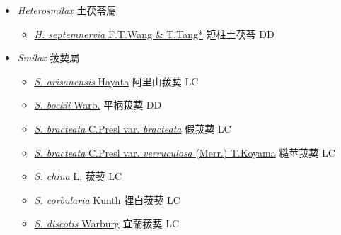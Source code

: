 
  \begin{itemize}
 \item[] \textit{Heterosmilax} 土茯苓屬
                                
  \begin{itemize}
        \item[] \href{http://www.theplantlist.org/tpl1.1/search?q=Heterosmilax+septemnervia}{\textit{H. septemnervia} F.T.Wang \& T.Tang*}   短柱土茯苓   DD
  \end{itemize}
 \item[] \textit{Smilax} 菝葜屬
                                
  \begin{itemize}
        \item[] \href{http://www.theplantlist.org/tpl1.1/search?q=Smilax+arisanensis}{\textit{S. arisanensis} Hayata}   阿里山菝葜   LC
        \item[] \href{http://www.theplantlist.org/tpl1.1/search?q=Smilax+bockii}{\textit{S. bockii} Warb.}   平柄菝葜   DD
        \item[] \href{http://www.theplantlist.org/tpl1.1/search?q=Smilax+bracteata+var.+bracteata}{\textit{S. bracteata} C.Presl var. \textit{bracteata}}   假菝葜   LC
        \item[] \href{http://www.theplantlist.org/tpl1.1/search?q=Smilax+bracteata+var.+verruculosa}{\textit{S. bracteata} C.Presl var. \textit{verruculosa} (Merr.) T.Koyama}   糙莖菝葜   LC
        \item[] \href{http://www.theplantlist.org/tpl1.1/search?q=Smilax+china}{\textit{S. china} L.}   菝葜   LC
        \item[] \href{http://www.theplantlist.org/tpl1.1/search?q=Smilax+corbularia}{\textit{S. corbularia} Kunth}   裡白菝葜   LC
        \item[] \href{http://www.theplantlist.org/tpl1.1/search?q=Smilax+discotis}{\textit{S. discotis} Warburg}   宜蘭菝葜   LC

\end{itemize}
\end{itemize}
